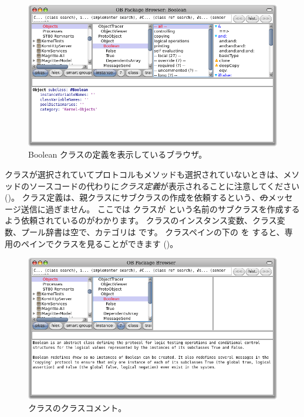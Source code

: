 \documentclass[a4paper,10pt,twoside]{book}
\begin{document}

\begin{figure}[hbt]
\centerline {\includegraphics[width=\textwidth]{Kernel-objects-boolean}}
\caption{Boolean クラスの定義を表示しているブラウザ。
}
\end{figure}

 クラスが選択されていてプロトコルもメソッドも選択されていないときは、メソッドのソースコードの代わりに\emph{クラス定義}が表示されることに注意してください ()。
クラス定義は、親クラスにサブクラスの作成を依頼するという、\st のメッセージ送信に過ぎません。
ここでは  クラスが  という名前のサブクラスを作成するよう依頼されているのがわかります。 クラスのインスタンス変数、クラス変数、プール辞書は空で、カテゴリは です。
クラスペインの下の  を \click すると、専用のペインでクラスを見ることができます ()。

\begin{figure}[hbt]
\centerline {\includegraphics[width=\textwidth]{classComment}}
\caption{ クラスのクラスコメント。
}
\end{figure}
\end{document}
